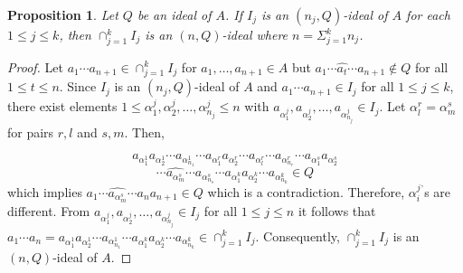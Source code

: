 \documentclass[10pt,a4paper]{amsart}
\newtheorem{proposition}[theorem]{Proposition}
\numberwithin{equation}{section}
\begin{document}
\begin{proposition} \label{4}
Let $Q$ be an   ideal of $A$. If $I_j$ is an $(n_j,Q)$-ideal of $A$ for each $1 \leq j \leq k$, then $\cap_{j=1}^k I_j$ is an $(n,Q)$-ideal where $n=\Sigma_{j=1}^k n_j$. 
\end{proposition}
\begin{proof}
Let $a_1 \cdots a_{n+1} \in \cap_{j=1}^k I_j$ for $a_1,\ldots,a_{n+1} \in A$ but $a_1\cdots \widehat{a_t} \cdots a_{n+1} \notin Q$ for all $1 \leq t \leq n$.  Since $I_j$ is an $(n_j,Q)$-ideal of $A$ and $a_1 \cdots a_{n+1} \in I_j$ for all $1 \leq j \leq k$, there exist elements  $1 \leq \alpha_1^j, \alpha_2^j,\ldots,\alpha_{n_j}^j \leq n$ with $a_{\alpha_1^j}, a_{\alpha_2^j},\ldots,a_{\alpha_{n_j}^j}  \in I_j$. Let $\alpha_l^r=\alpha_m^s$ for pairs $r,l$ and $s,m$. Then,  


\[a_{\alpha_1^1}  a_{\alpha_2^1}  \cdots  a_{\alpha_{n_1}^1}   \cdots a_{\alpha_1^r}  a_{\alpha_2^r}   \cdots   a_{\alpha_l^r}   \cdots   a_{\alpha_ {n_r}^r}   \cdots    a_{\alpha_1^s}   a_{\alpha_2^s}\]
\[ \cdots       \widehat{a_{\alpha_m^s}} \cdots  a_{\alpha_{n_s}^s} \cdots    a_{\alpha_1^k}   a_{\alpha_2^k}   \cdots   a_{\alpha_{n_k}^k} \in Q \]
which implies $a_1 \cdots \widehat{a_{\alpha_m^s}} \cdots a_na_{n+1} \in Q$ which is a contradiction. Therefore,  ${\alpha_i^j}^,$s are different. From $a_{\alpha_1^j}, a_{\alpha_2^j},\ldots,a_{\alpha_{n_j}^j}  \in I_j$ for all $1 \leq j \leq n$ it follows that $a_1 \cdots a_n=a_{\alpha_1^1}  a_{\alpha_2^1}  \cdots  a_{\alpha_{n_1}^1} \cdots a_{\alpha_1^k}   a_{\alpha_2^k}   \cdots   a_{\alpha_{n_k}^k} \in \cap_{j=1}^k I_j$. Consequently, $\cap_{j=1}^k I_j$ is an $(n,Q)$-ideal of $A$.
\end{proof}
\end{document}
